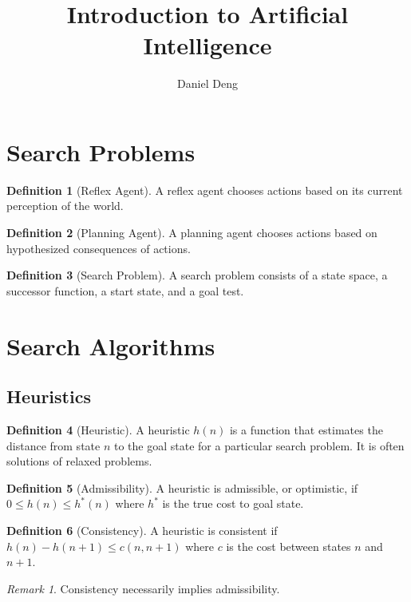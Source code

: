 \documentclass[11pt]{article}
\title{Introduction to Artificial Intelligence}
\author{Daniel Deng}
\date{}
\theoremstyle{definition}
\newtheorem{definition}{Definition}[section]
\theoremstyle{remark}
\newtheorem*{remark}{Remark}
\begin{document}
\maketitle

\section{Search Problems}
\begin{definition}[Reflex Agent]
A reflex agent chooses actions based on its current perception of the world.
\end{definition}

\begin{definition}[Planning Agent]
A planning agent chooses actions based on hypothesized consequences of actions.
\end{definition}

\begin{definition}[Search Problem]
A search problem consists of a state space, a successor function, a start state, and a goal test.
\end{definition}

\section{Search Algorithms}

\subsection{Heuristics}
\begin{definition}[Heuristic] 
A heuristic $h(n)$ is a function that estimates the distance from state $n$ to the goal state for a particular search problem. It is often solutions of relaxed problems.
\end{definition}

\begin{definition}[Admissibility] 
A heuristic is admissible, or optimistic, if $0 \leq h(n) \leq h^*(n)$ where $h^*$ is the true cost to goal state.
\end{definition}

\begin{definition}[Consistency]
A heuristic is consistent if $h(n) - h(n+1) \leq c(n, n+1)$ where $c$ is the cost between states $n$ and $n+1$.
\end{definition}

\begin{remark}
Consistency necessarily implies admissibility.
\end{remark}
\end{document}
